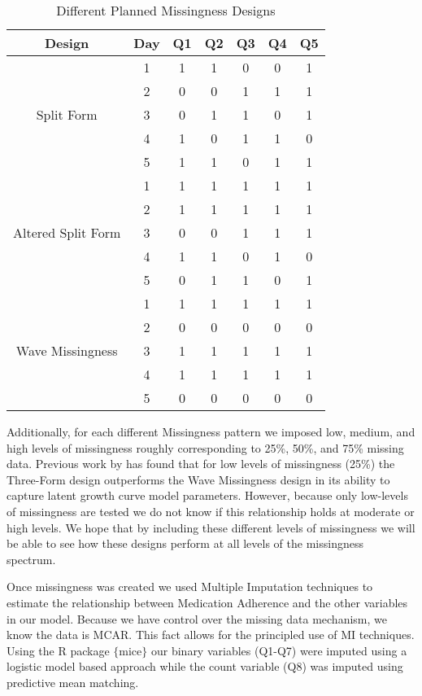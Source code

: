 \documentclass{svjour3}                     %
\begin{document}
\begin{table}[t!]
	\centering
	\caption{Different Planned Missingness Designs}
	\setlength{\tabcolsep}{0.45cm}
	\label{tab:table14}
	\hspace*{-1cm}
	\begin{tabular}{c|c|ccccc}
		\toprule
		Design & Day & Q1 & Q2 & Q3 & Q4 & Q5 \\
		\midrule
		\multirow{5}{*}{Split Form}
		& 1 & 1 & 1 & 0 & 0 & 1 \\
		& 2 & 0 & 0 & 1 & 1 & 1 \\
		& 3 & 0 & 1 & 1 & 0 & 1 \\
		& 4 & 1 & 0 & 1 & 1 & 0 \\
		& 5 & 1 & 1 & 0 & 1 & 1 \\
		\midrule
		\midrule
		\multirow{5}{*}{Altered Split Form}
		& 1 & 1 & 1 & 1 & 1 & 1 \\
		& 2 & 1 & 1 & 1 & 1 & 1 \\
		& 3 & 0 & 0 & 1 & 1 & 1 \\
		& 4 & 1 & 1 & 0 & 1 & 0 \\
		& 5 & 0 & 1 & 1 & 0 & 1 \\
		\midrule
		\midrule
		\multirow{5}{*}{Wave Missingness}
		& 1 & 1 & 1 & 1 & 1 & 1 \\
		& 2 & 0 & 0 & 0 & 0 & 0 \\
		& 3 & 1 & 1 & 1 & 1 & 1 \\
		& 4 & 1 & 1 & 1 & 1 & 1 \\
		& 5 & 0 & 0 & 0 & 0 & 0 \\
		\bottomrule
	\end{tabular}
	\hspace*{-1cm}	
\end{table}


Additionally, for each different Missingness pattern we imposed low, medium, and high levels of missingness roughly corresponding to 25\%, 50\%, and 75\% missing data. Previous work by \citet{rhemtulla2014planned} has found that for low levels of missingness (25\%) the Three-Form design outperforms the Wave Missingness design in its ability to capture latent growth curve model parameters. However, because only low-levels of missingness are tested we do not know if this relationship holds at moderate or high levels. We hope that by including these different levels of missingness we will be able to see how these designs perform at all levels of the missingness spectrum. \par
Once missingness was created we used Multiple Imputation techniques to estimate the relationship between Medication Adherence and the other variables in our model. Because we have control over the missing data mechanism, we know the data is MCAR. This fact allows for the principled use of MI techniques. Using the R package $\{$mice$\}$ \citep{mice2011imputation} our binary variables (Q1-Q7) were imputed using a logistic model based approach while the count variable (Q8) was imputed using predictive mean matching. \par
\end{document}
